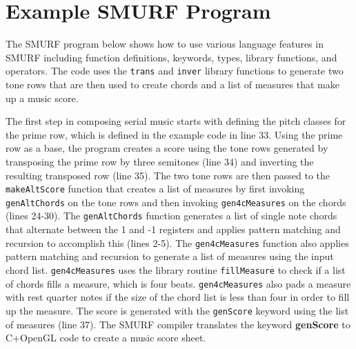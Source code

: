 \section{Example SMURF Program}

The SMURF program below shows how to use various language features in SMURF including function definitions, keywords, types, library functions, and operators. The code uses the \texttt{trans} and \texttt{inver} library functions to generate two tone rows that are then used to create chords and a list of measures that make up a music score. 

The first step in composing serial music starts with defining the pitch classes for the prime row, which is defined in the example code in line 33.  Using the prime row as a base, the program creates a score using the tone rows generated by transposing the prime row by three semitones (line 34) and inverting the resulting transposed row (line 35). The two tone rows are then passed to the \texttt{makeAltScore} function that creates a list of measures by first invoking \texttt{genAltChords} on the tone rows and then invoking \texttt{gen4cMeasures} on the chords (lines 24-30). The \texttt{genAltChords} function generates a list of single note chords that alternate between the 1 and -1 registers and applies pattern matching and recursion to accomplish this (lines 2-5). The \texttt{gen4cMeasures} function also applies pattern matching and recursion to generate a list of measures using the input chord list. \texttt{gen4cMeasures} uses the library routine \texttt{fillMeasure} to check if a list of chords fills a measure, which is four beats. \texttt{gen4cMeasures} also pads a measure with rest quarter notes if the size of the chord list is less than four in order to fill up the measure.  The score is generated with the \texttt{genScore} keyword using the list of measures (line 37). The SMURF compiler translates the keyword \textbf{genScore} to C+OpenGL code to create a music score sheet.     

